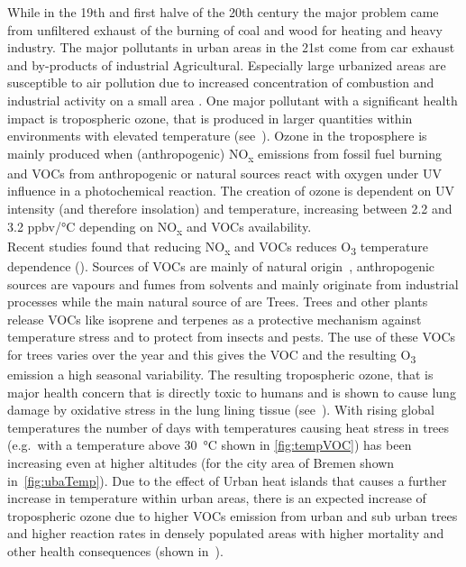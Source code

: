 \documentclass[12pt,a4paper, english,twoside]{article}
\begin{document}
      While in the 19th and first halve of the 20th century the major problem came from unfiltered exhaust of the burning of coal and wood for heating and heavy industry.
      The major pollutants in urban areas in the 21st come from car exhaust and by-products of industrial Agricultural. %
      Especially large urbanized areas are susceptible to air pollution due to increased concentration of combustion and industrial activity on a small area \autocite{Kanakidou2011}.
      One major pollutant with a significant health impact is tropospheric ozone, that is produced in larger quantities within environments with elevated temperature (see~\cite{Ebi2008}). 
      Ozone in the troposphere is mainly produced when (anthropogenic) NO\textsubscript{x} emissions from fossil fuel burning and \glspl{VOC} from anthropogenic or natural sources react with oxygen under UV influence in a photochemical reaction.  
      The creation of ozone is dependent on UV intensity (and therefore insolation) and temperature, increasing between 2.2 and 3.2 ppbv/°C depending on NO\textsubscript{x} and \glspl{VOC} availability. \\
      Recent studies found that reducing NO\textsubscript{x} and \glspl{VOC} reduces O\textsubscript{3} temperature dependence (\cite{Otero2021}).
      Sources of \glspl{VOC} are mainly of natural origin~\autocite{Kansal2009}, anthropogenic sources are vapours and fumes from solvents and mainly originate from industrial processes while the main natural source of  are Trees.
      Trees and other plants release VOCs like isoprene and terpenes as a protective mechanism against temperature stress and to protect from insects and pests. 
      The use of these \glspl{VOC} for trees varies over the year and this gives the \gls{VOC} and the resulting O\textsubscript{3} emission a high seasonal variability. 
      The resulting tropospheric ozone, that is major health concern that is directly toxic to humans and is shown to cause lung damage by oxidative stress in the lung lining tissue (see~\cite{Mudway2000}). 
      With rising global temperatures the number of days with temperatures causing heat stress in trees (e.g.\ with a temperature above 30~°C shown in \cref{fig:tempVOC}) has been increasing even at higher altitudes (for the city area of Bremen shown in~\cref{fig:ubaTemp}).
      Due to the effect of Urban heat islands that causes a further increase in temperature within urban areas, there is an expected increase of tropospheric ozone due to higher \glspl{VOC} emission from urban and sub urban trees and higher reaction rates in densely populated areas with higher mortality and other health consequences (shown in~\cite{Ebi2008}).\\ 
\end{document}
